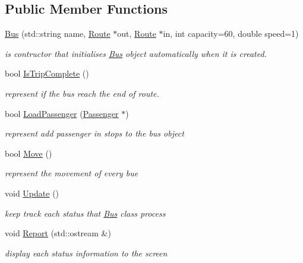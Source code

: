 \subsection*{Public Member Functions}
\begin{DoxyCompactItemize}
\item 
\hyperlink{classBus_aa28c3c318b6993f3a3aebf211daa9217}{Bus} (std\+::string name, \hyperlink{classRoute}{Route} $\ast$out, \hyperlink{classRoute}{Route} $\ast$in, int capacity=60, double speed=1)
\begin{DoxyCompactList}\small\item\em is contructor that initialises \hyperlink{classBus}{Bus} object automatically when it is created. \end{DoxyCompactList}\item 
bool \hyperlink{classBus_a9c64b0801bf589f121fb0598b70a99b4}{Is\+Trip\+Complete} ()
\begin{DoxyCompactList}\small\item\em represent if the bus reach the end of route. \end{DoxyCompactList}\item 
bool \hyperlink{classBus_ac3f1c523bc4f97bc8ada8dc488ab3484}{Load\+Passenger} (\hyperlink{classPassenger}{Passenger} $\ast$)
\begin{DoxyCompactList}\small\item\em represent add passenger in stops to the bus object \end{DoxyCompactList}\item 
bool \hyperlink{classBus_a5e667186d6db0916ebab0e4eff3312c8}{Move} ()
\begin{DoxyCompactList}\small\item\em represent the movement of every bue \end{DoxyCompactList}\item 
void \hyperlink{classBus_a9896f74f16966f7621d0dfafff0ec6b4}{Update} ()
\begin{DoxyCompactList}\small\item\em keep track each status that \hyperlink{classBus}{Bus} class process \end{DoxyCompactList}\item 
void \hyperlink{classBus_a4e50209dde52bff3de231c8259b38982}{Report} (std\+::ostream \&)
\begin{DoxyCompactList}\small\item\em display each status information to the screen \end{DoxyCompactList}\item 

\end{DoxyCompactItemize}
